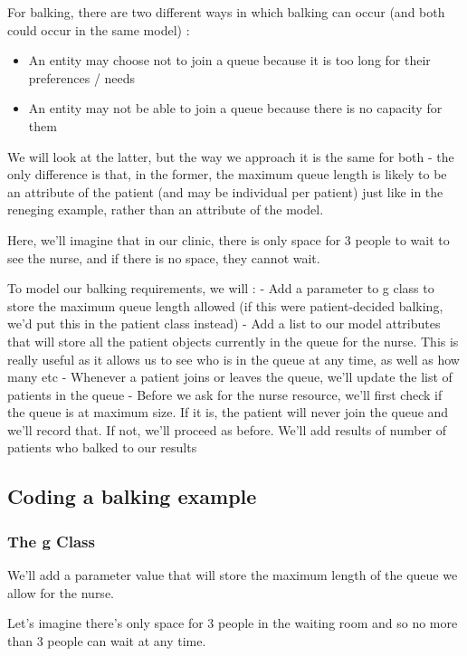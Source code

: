 \documentclass[
  letterpaper,
  DIV=11,
  numbers=noendperiod]{scrreprt}
\providecommand{\tightlist}{%
  \setlength{\itemsep}{0pt}\setlength{\parskip}{0pt}}\usepackage{longtable,booktabs,array}
\begin{document}
For balking, there are two different ways in which balking can occur
(and both could occur in the same model) :

\begin{itemize}
\tightlist
\item
  An entity may choose not to join a queue because it is too long for
  their preferences / needs
\item
  An entity may not be able to join a queue because there is no capacity
  for them
\end{itemize}

We will look at the latter, but the way we approach it is the same for
both - the only difference is that, in the former, the maximum queue
length is likely to be an attribute of the patient (and may be
individual per patient) just like in the reneging example, rather than
an attribute of the model.

Here, we'll imagine that in our clinic, there is only space for 3 people
to wait to see the nurse, and if there is no space, they cannot wait.

To model our balking requirements, we will : - Add a parameter to g
class to store the maximum queue length allowed (if this were
patient-decided balking, we'd put this in the patient class instead) -
Add a list to our model attributes that will store all the patient
objects currently in the queue for the nurse. This is really useful as
it allows us to see who is in the queue at any time, as well as how many
etc - Whenever a patient joins or leaves the queue, we'll update the
list of patients in the queue - Before we ask for the nurse resource,
we'll first check if the queue is at maximum size. If it is, the patient
will never join the queue and we'll record that. If not, we'll proceed
as before. We'll add results of number of patients who balked to our
results

\subsection{Coding a balking example}\label{coding-a-balking-example}

\subsubsection{The g Class}\label{the-g-class-5}

We'll add a parameter value that will store the maximum length of the
queue we allow for the nurse.

Let's imagine there's only space for 3 people in the waiting room and so
no more than 3 people can wait at any time.
\end{document}
